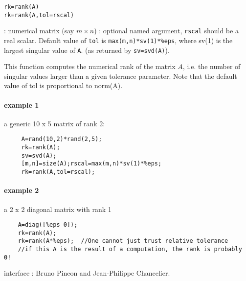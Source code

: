 
\begin{mandesc}
\end{mandesc}

\begin{calling_sequence}
\begin{verbatim}
rk=rank(A)
rk=rank(A,tol=rscal)
\end{verbatim}
\end{calling_sequence}
\begin{parameters}
  \begin{varlist}
    :  numerical matrix (say $m \times n$)
    : optional named argument, \verb+rscal+ should be a real scalar. Default value of \verb+tol+ is \verb+max(m,n)*sv(1)*%eps+, where sv(1) is the largest singular value of \verb+A+. (as returned by \verb+sv=svd(A)+).
  \end{varlist}
\end{parameters}

\begin{mandescription}
This function computes the numerical rank of the matrix $A$, i.e. the number
of singular values larger than a given tolerance parameter. Note that the 
default value of tol is proportional to norm(A).
\end{mandescription}

\begin{examples}
\paragraph{example 1} a generic 10 x 5 matrix of rank 2:
  \begin{Verbatim}
     A=rand(10,2)*rand(2,5);
     rk=rank(A);
     sv=svd(A);
     [m,n]=size(A);rscal=max(m,n)*sv(1)*%eps;
     rk=rank(A,tol=rscal);
  \end{Verbatim}
\paragraph{example 2} a 2 x 2 diagonal matrix with rank 1
  \begin{Verbatim}
    A=diag([%eps 0]);
    rk=rank(A);
    rk=rank(A*%eps);  //One cannot just trust relative tolerance
    //if this A is the result of a computation, the rank is probably 0! 
  \end{Verbatim}

\end{examples}

\begin{manseealso}
\end{manseealso}

\begin{authors}
   interface : Bruno Pincon and Jean-Philippe Chancelier. 
\end{authors}
